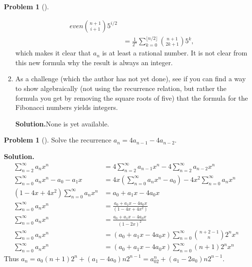 \documentclass[10pt,]{book}
\theoremstyle{plain}
\theoremstyle{definition}
\newtheorem{activity}[project]{Problem}
\theoremstyle{definition}
\numberwithin{equation}{chapter}
\newcommand{\amp}{&}
\begin{document}
\begin{activity}[]
\begin{enumerate}[font=\bfseries,label=(\alph*),ref=\alph*]
\begin{align*}
{{even} }  \binom{n+1}{i+1}5^{i/2}\\
\amp= \frac{1}{2^n}\sum_{k=0}^{\lfloor n/2 \rfloor}\binom{n+1}{2k+1}5^k,
\end{align*}
which makes it clear that \(a_n\) is at least a rational number. It is not clear from this new formula why the result is always an integer.%
\item\label{task-160} As a challenge (which the author has not yet done), see if you can find a way to show algebraically (not using the recurrence relation, but rather the formula you get by removing the square roots of five) that the formula for the Fibonacci numbers yields integers.%
\par\medskip\noindent%
\textbf{Solution.}\quad None is yet available.%
\end{enumerate}
\end{activity}
\begin{activity}[]\label{activity-223}
Solve the recurrence \(a_n= 4a_{n-1} - 4a_{n-2}\).%
\par\medskip\noindent%
\textbf{Solution.}\quad %
\begin{align*}
\sum_{n=2}^\infty a_nx^n  \amp=  4\sum_{n=2}^\infty a_{n-1}x^n -
4\sum_{n=2}^\infty a_{n-2}x^n\\
\sum_{n=0}^\infty a_nx^n -a_0-a_1x  \amp=  4x(\sum_{n=0}^\infty a_{n}x^n
-a_0) - 4x^2\sum_{n=0}^\infty a_{n}x^n\\
(1-4x+4x^2)\sum_{n=0}^\infty a_nx^n   \amp=
a_0+a_1x-4a_0x\\
\sum_{n=0}^\infty a_nx^n \amp= \frac{a_0+a_1x-4a_0x}{(1-4x+4x^2)}\\
\sum_{n=0}^\infty a_nx^n \amp= \frac{a_0+a_1x-4a_0x}{(1-2x)^2}\\
\sum_{n=0}^\infty a_nx^n \amp= (a_0+a_1x-4a_0x)\sum_{n=0}^\infty \binom{n+2-1}{n}
2^nx^n\\
\sum_{n=0}^\infty a_nx^n \amp= (a_0+a_1x-4a_0x)\sum_{n=0}^\infty (n+1)
2^nx^n
\end{align*}
Thus \(a_n=a_0(n+1)2^n
+(a_1-4a_0)n2^{n-1}=a_02^n+(a_1-2a_0)n2^{n-1}\).%
\end{activity}
\typeout{************************************************}
\typeout{************************************************}
\end{document}

